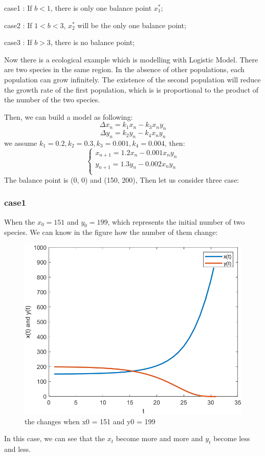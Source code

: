 \documentclass[12pt]{article}
\begin{document}
case1 : If $b < 1$, there is only one balance point $x_1^*$;

case2 : If $1 < b < 3$, $x_2^*$ will be the only one balance point;

case3 : If $b > 3$, there is no balance point;

Now there is a ecological example which is modelling with Logistic Model. There are two species in the same region. In the absence of other populations, each population can grow infinitely. The existence of the second population will reduce the growth rate of the first population, which is is proportional to the product of the number of the two species.

Then, we can build a model as following:
\begin{equation}
    \Delta x_n = k_1x_n - k_3x_ny_n\tag{1.5.2}
\end{equation}
\begin{equation}
    \Delta y_n = k_2y_n - k_4x_ny_n\tag{1.5.3}
\end{equation}
we assume $k_1 = 0.2, k_2 = 0.3, k_3 = 0.001, k_4 = 0.004$, then:
\begin{equation}
    \begin{cases}
    x_{n+1} = 1.2x_n - 0.001x_n y_n \\
    y_{n+1} = 1.3y_n - 0.002x_n y_n \\
    \end{cases}\tag{1.5.4}
\end{equation}
The balance point is (0, 0) and (150, 200), Then let us consider three case:

\subsubsection{case1}
    When the $x_0 = 151$ and $y_0 = 199$, which represents the initial number of two species. We can know in the figure how the number of them change:
    \begin{figure}[htbp]
    \centering
    \includegraphics[scale=0.5]{numbers_1.png}
    \caption{the changes when x0 = 151 and y0 = 199}
    \label{fig:my_label}
\end{figure}
In this case, we can see that the $x_t$ become more and more and $y_t$ become less and less.
\end{document}
